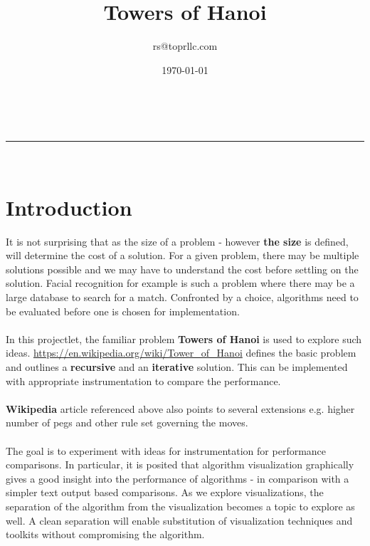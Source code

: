 \documentclass[a4paper,11pt]{article}
\makeatletter
\newcommand{\linia}{\rule{\linewidth}{0.5pt}}
\theoremstyle{mytheor}
\renewcommand{\maketitle}{
\begin{center}
\vspace{2ex}
{\huge \textsc{\@title}}
\vspace{1ex}
\\
\linia\\
\@author \hfill \@date
\vspace{4ex}
\end{center}
}
\makeatother
\begin{document}
\title{Towers of Hanoi}

\author{rs@toprllc.com}

\date{\today}

\maketitle

\section*{Introduction}

It is not surprising that as the size of a problem - however \textbf{the size} is defined, will determine the cost of a solution. For a given problem, there may be multiple solutions possible and we may have to understand the cost before settling on the solution. Facial recognition for example is such a problem where there may be a large database to search for a match. Confronted by a choice, algorithms need to be evaluated before one is chosen for implementation.


\paragraph{}In this projectlet, the familiar problem \textbf{Towers of Hanoi} is used to explore such ideas. \url{https://en.wikipedia.org/wiki/Tower_of_Hanoi} defines the basic problem and outlines a \textbf{recursive} and an \textbf{iterative} solution. This can be implemented with appropriate instrumentation to compare the performance.

\paragraph{}\textbf{Wikipedia} article referenced above also points to several extensions e.g. higher number of pegs and other rule set governing the moves.

\paragraph{}The goal is to experiment with ideas for instrumentation for performance comparisons. In particular, it is posited that algorithm visualization graphically gives a good insight into the performance of algorithms - in comparison with a simpler text output based comparisons. As we explore visualizations, the separation of the algorithm from the visualization becomes a topic to explore as well. A clean separation will enable substitution of visualization techniques and toolkits without compromising the algorithm.
\end{document}
